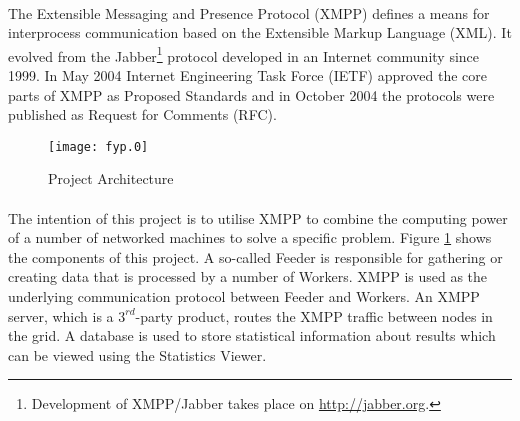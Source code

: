 \paragraph{}
The Extensible Messaging and Presence Protocol (XMPP) defines a means for interprocess communication based on the Extensible Markup Language (XML). It evolved from the Jabber\footnote{Development of XMPP/Jabber takes place on \href{http://jabber.org}{http://jabber.org}.} protocol developed in an Internet community since 1999. In May 2004 Internet Engineering Task Force (IETF) approved the core parts of XMPP \cite{xmpp-core,xmpp-im} as Proposed Standards and in October 2004 the protocols were published as Request for Comments (RFC).

\begin{figure}[H]
\begin{center}
\texttt{[image: fyp.0]}
\end{center}
\caption{Project Architecture}
\label{fig:architectureIntro}
\end{figure}

\paragraph{}
The intention of this project is to utilise XMPP to combine the computing power of a number of networked machines to solve a specific problem. Figure \ref{fig:architectureIntro} shows the components of this project. A so-called Feeder is responsible for gathering or creating data that is processed by a number of Workers. XMPP is used as the underlying communication protocol between Feeder and Workers. An XMPP server, which is a $3^{rd}$-party product, routes the XMPP traffic between nodes in the grid. A database is used to store statistical information about results which can be viewed using the Statistics Viewer.
